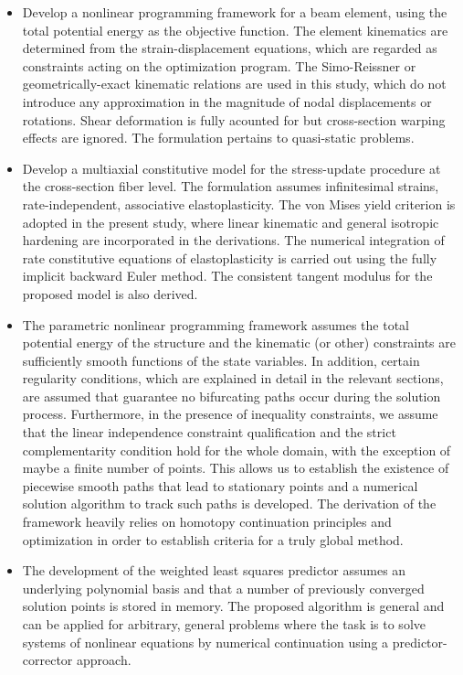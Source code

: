 \begin{itemize}
	\item Develop a nonlinear programming framework for a beam element, using the 
	total potential energy as the objective function. The element kinematics are 
	determined from the strain-displacement equations, which are regarded as 
	constraints acting on the optimization program. The Simo-Reissner or 
	geometrically-exact kinematic relations are used in this study, which do not 
	introduce any approximation in the magnitude of nodal displacements or rotations. 
	Shear deformation is fully acounted for but cross-section warping effects are 
	ignored. The formulation pertains to quasi-static problems.
	
	\item Develop a multiaxial constitutive model for the stress-update procedure at 
	the cross-section fiber level. The formulation assumes infinitesimal strains, 
	rate-independent, associative elastoplasticity. The von Mises yield criterion is 
	adopted in the present study, where linear kinematic and general isotropic 
	hardening are incorporated in the derivations. The numerical integration of rate 
	constitutive equations of elastoplasticity is carried out using the fully 
	implicit backward Euler method. The consistent tangent modulus for the 
	proposed 
	model is also derived.
	
	\item The parametric nonlinear programming framework assumes the total potential 
	energy of the structure and the kinematic (or other) constraints are sufficiently 
	smooth functions of the state variables. In addition, certain regularity 
	conditions, which are explained in detail in the relevant sections, are assumed 
	that guarantee no bifurcating paths occur during the solution process. 
	Furthermore, in the presence of inequality constraints, we assume that the linear 
	independence constraint qualification and the strict complementarity condition 
	hold for the whole domain, with the exception of maybe a finite number of points. 
	This allows us to establish the existence of piecewise smooth paths that 
	lead to 
	stationary points and a numerical solution algorithm to track such paths is 
	developed. The derivation of the framework heavily relies on homotopy 
	continuation principles and optimization in order to establish criteria for 
	a truly global method.
	
	\item The development of the weighted least squares predictor assumes an 
	underlying polynomial basis and that a number of previously converged solution 
	points is stored in memory. The proposed algorithm is general and can be 
	applied for arbitrary, general problems where the task is to solve systems 
	of nonlinear 
	equations by numerical continuation using a predictor-corrector approach. 
\end{itemize}
